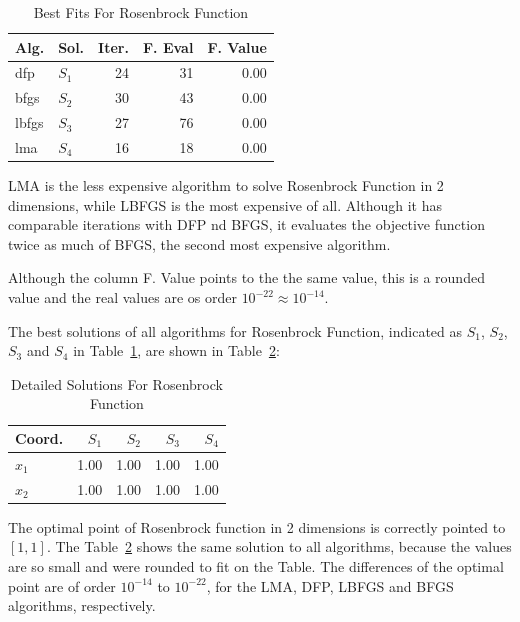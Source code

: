 \documentclass[conference]{IEEEtran}
\begin{document}
\begin{table}[H]
\centering
\caption{Best Fits For Rosenbrock Function}
\label{solutions:rosenbrock2d}
\begin{tabular}{llrrr}
\toprule
 Alg. &    Sol. &  Iter. &  F. Eval &  F. Value \\
\midrule
  dfp & $S_{1}$ &     24 &       31 &      0.00 \\
 bfgs & $S_{2}$ &     30 &       43 &      0.00 \\
lbfgs & $S_{3}$ &     27 &       76 &      0.00 \\
  lma & $S_{4}$ &     16 &       18 &      0.00 \\
\bottomrule
\end{tabular}
\end{table}

LMA is the less expensive algorithm to solve Rosenbrock Function in 2 dimensions, while LBFGS
is the most expensive of all. Although it has comparable iterations with DFP nd BFGS, it evaluates
the objective function twice as much of BFGS, the second most expensive algorithm.

Although the column F. Value points to the the same value, this is a rounded value
and the real values are os order $10^{-22} \approx 10^{-14}$.

The best solutions of all algorithms for Rosenbrock Function, indicated as
$S_{1}$, $S_{2}$, $S_{3}$ and $S_{4}$ in Table~\ref{solutions:rosenbrock2d}, are shown
in Table~\ref{detailedsolutions:rosenbrock2d}:

\begin{table}[H]
\centering
\caption{Detailed Solutions For Rosenbrock Function}
\label{detailedsolutions:rosenbrock2d}
\begin{tabular}{lrrrr}
\toprule
 Coord. &  $S_{1}$ &  $S_{2}$ &  $S_{3}$ &  $S_{4}$ \\
\midrule
$x_{1}$ &     1.00 &     1.00 &     1.00 &     1.00 \\
$x_{2}$ &     1.00 &     1.00 &     1.00 &     1.00 \\
\bottomrule
\end{tabular}
\end{table}

The optimal point of Rosenbrock function in 2 dimensions is correctly pointed to $\left[1, 1\right]$. The Table~\ref{detailedsolutions:rosenbrock2d}
shows the same solution to all algorithms, because the values are so small and were rounded to fit on the Table. The differences of
the optimal point are of order $10^{-14}$ to $10^{-22}$, for the LMA, DFP, LBFGS and BFGS algorithms, respectively.
\end{document}
